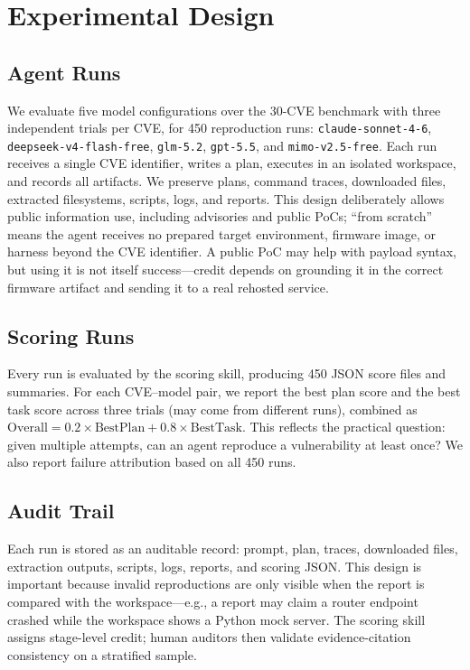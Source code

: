 \section{Experimental Design}
\subsection{Agent Runs}
We evaluate five model configurations over the 30-CVE benchmark with three independent trials per CVE, for 450 reproduction runs: \texttt{claude-sonnet-4-6}, \texttt{deepseek-v4-flash-free}, \texttt{glm-5.2}, \texttt{gpt-5.5}, and \texttt{mimo-v2.5-free}. Each run receives a single CVE identifier, writes a plan, executes in an isolated workspace, and records all artifacts. We preserve plans, command traces, downloaded files, extracted filesystems, scripts, logs, and reports. This design deliberately allows public information use, including advisories and public PoCs; ``from scratch'' means the agent receives no prepared target environment, firmware image, or harness beyond the CVE identifier. A public PoC may help with payload syntax, but using it is not itself success---credit depends on grounding it in the correct firmware artifact and sending it to a real rehosted service.

\subsection{Scoring Runs}
Every run is evaluated by the scoring skill, producing 450 JSON score files and summaries. For each CVE--model pair, we report the best plan score and the best task score across three trials (may come from different runs), combined as $\text{Overall} = 0.2 \times \text{BestPlan} + 0.8 \times \text{BestTask}$. This reflects the practical question: given multiple attempts, can an agent reproduce a vulnerability at least once? We also report failure attribution based on all 450 runs.

\subsection{Audit Trail}
Each run is stored as an auditable record: prompt, plan, traces, downloaded files, extraction outputs, scripts, logs, reports, and scoring JSON. This design is important because invalid reproductions are only visible when the report is compared with the workspace---e.g., a report may claim a router endpoint crashed while the workspace shows a Python mock server. The scoring skill assigns stage-level credit; human auditors then validate evidence-citation consistency on a stratified sample.

